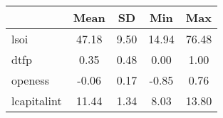 {
\def\sym#1{\ifmmode^{#1}\else\(^{#1}\)\fi}
\begin{tabular}{l*{1}{cccc}}
\hline\hline
            &        Mean&          SD&         Min&         Max\\
\hline
lsoi        &       47.18&        9.50&       14.94&       76.48\\
dtfp        &        0.35&        0.48&        0.00&        1.00\\
openess     &       -0.06&        0.17&       -0.85&        0.76\\
lcapitalint &       11.44&        1.34&        8.03&       13.80\\
\hline\hline
\end{tabular}
}
